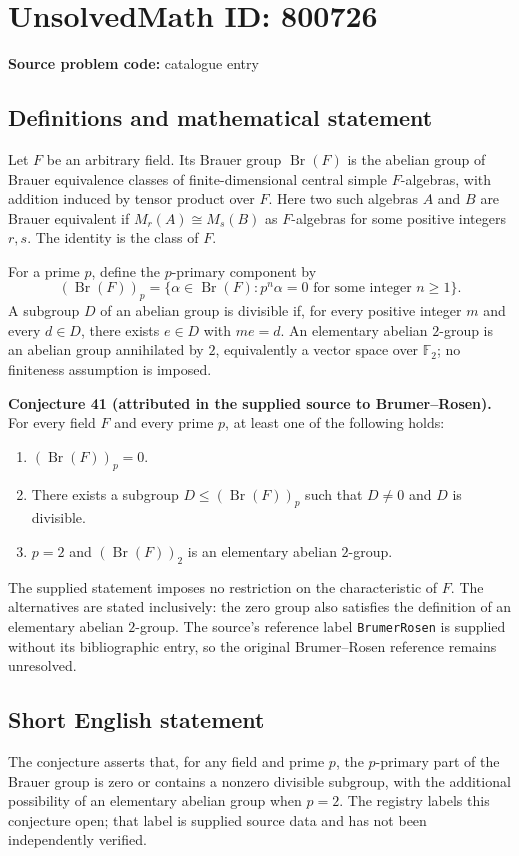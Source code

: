 \documentclass[11pt]{article}
\begin{document}
\section*{UnsolvedMath ID: 800726}
\textbf{Source problem code:} catalogue entry
\subsection{Definitions and mathematical statement}
Let \(F\) be an arbitrary field. Its Brauer group \(\operatorname{Br}(F)\) is the abelian group of Brauer equivalence classes of finite-dimensional central simple \(F\)-algebras, with addition induced by tensor product over \(F\). Here two such algebras \(A\) and \(B\) are Brauer equivalent if \(M_r(A)\cong M_s(B)\) as \(F\)-algebras for some positive integers \(r,s\). The identity is the class of \(F\).

For a prime \(p\), define the \(p\)-primary component by
\[
(\operatorname{Br}(F))_p
=\{\alpha\in\operatorname{Br}(F):p^n\alpha=0\text{ for some integer }n\geq 1\}.
\]
A subgroup \(D\) of an abelian group is divisible if, for every positive integer \(m\) and every \(d\in D\), there exists \(e\in D\) with \(me=d\). An elementary abelian \(2\)-group is an abelian group annihilated by \(2\), equivalently a vector space over \(\mathbb{F}_2\); no finiteness assumption is imposed.

\textbf{Conjecture 41 (attributed in the supplied source to Brumer--Rosen).} For every field \(F\) and every prime \(p\), at least one of the following holds:
\begin{enumerate}
\item \((\operatorname{Br}(F))_p=0\).
\item There exists a subgroup \(D\leq(\operatorname{Br}(F))_p\) such that \(D\neq 0\) and \(D\) is divisible.
\item \(p=2\) and \((\operatorname{Br}(F))_2\) is an elementary abelian \(2\)-group.
\end{enumerate}
The supplied statement imposes no restriction on the characteristic of \(F\). The alternatives are stated inclusively: the zero group also satisfies the definition of an elementary abelian \(2\)-group. The source's reference label \texttt{BrumerRosen} is supplied without its bibliographic entry, so the original Brumer--Rosen reference remains unresolved.
\subsection{Short English statement}
The conjecture asserts that, for any field and prime \(p\), the \(p\)-primary part of the Brauer group is zero or contains a nonzero divisible subgroup, with the additional possibility of an elementary abelian group when \(p=2\). The registry labels this conjecture open; that label is supplied source data and has not been independently verified.
\end{document}
